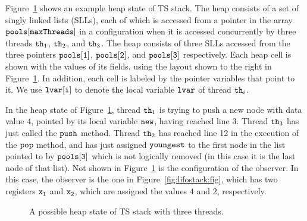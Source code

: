 Figure~\ref{fig:tsshape} shows an  example heap state of TS stack.
The heap consists of a set of singly linked lists (SLLs), each of which
is accessed from a pointer in the array ${\tt pools[maxThreads]}$
in a configuration when %
it is accessed concurrently by three threads ${\tt th}_1$, ${\tt th}_2$, and ${\tt th}_3$. The heap consists of three SLLs accessed from the three pointers $\tt pools[1]$, $\tt pools[2]$, and $\tt pools[3]$ respectively. Each heap cell is
shown with the values of its fields, using the layout shown to the right in
Figure~\ref{fig:tsshape}.
In addition, each cell is labeled by the
pointer variables that point to it. We use ${\tt lvar[i]}$ to denote the local
variable ${\tt lvar}$ of thread ${\tt th}_i$.

In the heap state of Figure~\ref{fig:tsshape},
thread ${\tt th}_1$ is trying to push a new node with data value $4$, pointed by its local variable $\tt new$, having reached line 3.
Thread ${\tt th}_3$ has just called the ${\tt push}$ method.
Thread ${\tt th}_2$ has reached line 12 in the execution of the ${\tt pop}$ method,  and has just assigned ${\tt youngest}$ to the first node in the list
pointed to by $\tt pools[3]$ which is not logically removed (in this case it is the last node of that list).
Not shown in Figure~\ref{fig:tsshape} is the configuration of the
observer.
In this case, the
observer is the one in Figure~\ref{fig:lifostack:fig}, which has two registers
$\tt x_1$ and $\tt x_2$, which are assigned the values $4$ and $2$,
respectively.

\begin{figure}
	
\caption{A possible heap state of TS stack with three threads.}
\label{fig:tsshape}
\end{figure} 



